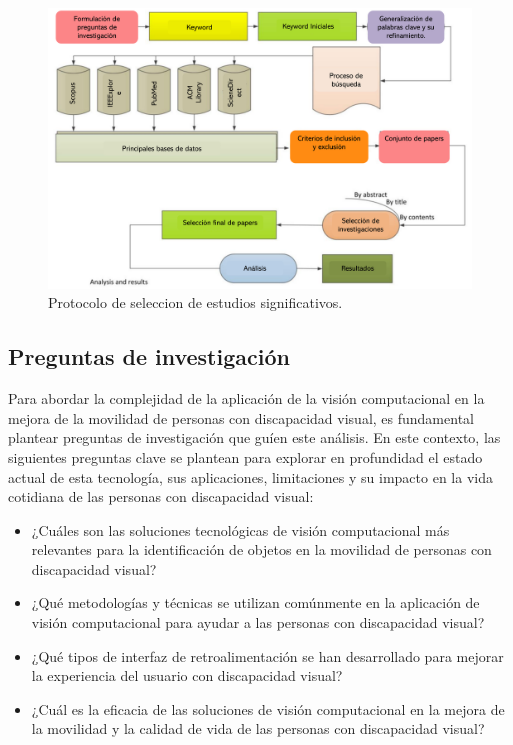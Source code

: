 \documentclass[letterpaper]{article}
\begin{document}
        \begin{figure}[hbtp]
    		\centering
    		\includegraphics[width=1\columnwidth]{graficos/protocolo-seguido.png}
    		\caption{Protocolo de seleccion de estudios significativos.}
    		\label{operadores}
    	\end{figure}
 
	\subsection{Preguntas de investigación}
	Para abordar la complejidad de la aplicación de la visión computacional en la mejora de la movilidad de personas con discapacidad visual, es fundamental plantear preguntas de investigación que guíen este análisis. En este contexto, las siguientes preguntas clave se plantean para explorar en profundidad el estado actual de esta tecnología, sus aplicaciones, limitaciones y su impacto en la vida cotidiana de las personas con discapacidad visual:
    \begin{itemize}
        \item ¿Cuáles son las soluciones tecnológicas de visión computacional más relevantes para la identificación de objetos en la movilidad de personas con discapacidad visual?
        \item ¿Qué metodologías y técnicas se utilizan comúnmente en la aplicación de visión computacional para ayudar a las personas con discapacidad visual?
        \item ¿Qué tipos de interfaz de retroalimentación se han desarrollado para mejorar la experiencia del usuario con discapacidad visual?
        \item ¿Cuál es la eficacia de las soluciones de visión computacional en la mejora de la movilidad y la calidad de vida de las personas con discapacidad visual?
    \end{itemize}
\end{document}
